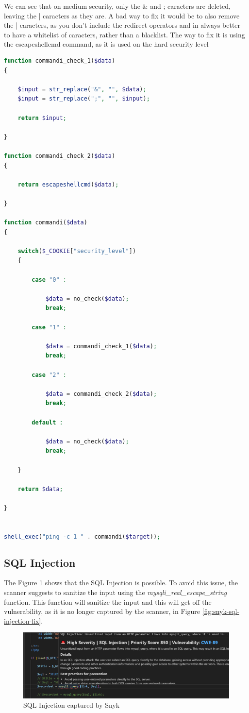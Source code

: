 \documentclass{article}
\begin{document}
We can see that on medium security, only the \& and ; caracters are deleted, leaving the | caracters as they are.
A bad way to fix it would be to also remove the | caracters, as you don't include the redirect operators and in always better to have a whitelist of caracters, rather than a blacklist.
The way to fix it is using the escapeshellcmd command, as it is used on the hard security level
\begin{lstlisting}[language=php,caption={Backdoor Code},label=php:command-injection-code]
function commandi_check_1($data)
{
    
    $input = str_replace("&", "", $data);
    $input = str_replace(";", "", $input);
    
    return $input;
    
}

function commandi_check_2($data)
{
   
    return escapeshellcmd($data);
    
}

function commandi($data)
{

    switch($_COOKIE["security_level"])
    {

        case "0" :

            $data = no_check($data);
            break;

        case "1" :

            $data = commandi_check_1($data);
            break;

        case "2" :

            $data = commandi_check_2($data);
            break;

        default :

            $data = no_check($data);
            break;

    }

    return $data;

}


shell_exec("ping -c 1 " . commandi($target));
\end{lstlisting}

\subsection{SQL Injection}
\par The Figure \ref{fig:snyk-sql-injection-issue} shows that the SQL Injection is possible. To avoid this issue, the scanner suggests to sanitize the input using the \textit{mysqli\_real\_escape\_string} function. This function will sanitize the input and this will get off the vulnerability, as it is no longer captured by the scanner, in Figure \ref{fig:snyk-sql-injection-fix}.
\begin{figure}[H]
    \centering
    \includegraphics[width=0.5\linewidth]{Figures/defensive/sql-injection-problem.PNG}
    \caption{SQL Injection captured by Snyk}
    \label{fig:snyk-sql-injection-issue}
\end{figure}
\end{document}
